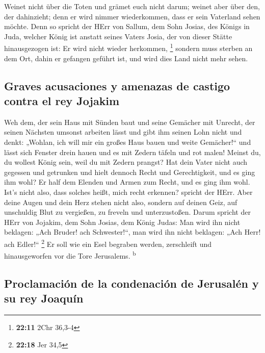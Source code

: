  Weinet nicht über die Toten und grämet euch nicht darum;
weinet aber über den, der dahinzieht; denn er wird nimmer wiederkommen,
dass er sein Vaterland sehen möchte.  Denn so spricht der
HErr von Sallum, dem Sohn Josias, des Königs in Juda, welcher König ist
anstatt seines Vaters Josia, der von dieser Stätte hinausgezogen ist: Er
wird nicht wieder herkommen, \footnote{\textbf{22:11} 2Chr 36,3-4}
 sondern muss sterben an dem Ort, dahin er gefangen
geführt ist, und wird dies Land nicht mehr sehen.

\hypertarget{graves-acusaciones-y-amenazas-de-castigo-contra-el-rey-jojakim}{%
\subsection{Graves acusaciones y amenazas de castigo contra el rey
Jojakim}\label{graves-acusaciones-y-amenazas-de-castigo-contra-el-rey-jojakim}}

 Weh dem, der sein Haus mit Sünden baut und seine
Gemächer mit Unrecht, der seinen Nächsten umsonst arbeiten lässt und
gibt ihm seinen Lohn nicht  und denkt: „Wohlan, ich will
mir ein großes Haus bauen und weite Gemächer!{}`` und lässt sich Fenster
drein hauen und es mit Zedern täfeln und rot malen! 
Meinst du, du wollest König sein, weil du mit Zedern prangst? Hat dein
Vater nicht auch gegessen und getrunken und hielt dennoch Recht und
Gerechtigkeit, und es ging ihm wohl?  Er half dem Elenden
und Armen zum Recht, und es ging ihm wohl. Ist's nicht also, dass
solches heißt, mich recht erkennen? spricht der HErr. 
Aber deine Augen und dein Herz stehen nicht also, sondern auf deinen
Geiz, auf unschuldig Blut zu vergießen, zu freveln und unterzustoßen.
 Darum spricht der HErr von Jojakim, dem Sohn Josias, dem
König Judas: Man wird ihn nicht beklagen: „Ach Bruder! ach
Schwester!{}``, man wird ihn nicht beklagen: „Ach Herr! ach Edler!{}``
\footnote{\textbf{22:18} Jer 34,5}  Er soll wie ein Esel
begraben werden, zerschleift und hinausgeworfen vor die Tore Jerusalems.
\textsuperscript{b}

\hypertarget{proclamaciuxf3n-de-la-condenaciuxf3n-de-jerusaluxe9n-y-su-rey-joaquuxedn}{%
\subsection{Proclamación de la condenación de Jerusalén y su rey
Joaquín}\label{proclamaciuxf3n-de-la-condenaciuxf3n-de-jerusaluxe9n-y-su-rey-joaquuxedn}}

